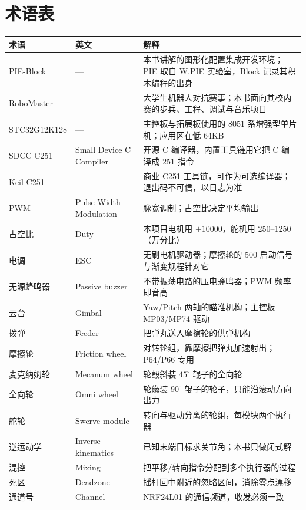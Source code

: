 \chapter{术语表}
\label{app:glossary}

\begin{center}
\begin{tabularx}{\linewidth}{@{}l l >{\raggedright\arraybackslash}X@{}}
\toprule
术语 & 英文 & 解释 \\
\midrule
PIE-Block & --- & 本书讲解的图形化配置集成开发环境；PIE 取自 W.PIE 实验室，Block 记录其积木编程的出身 \\
RoboMaster & --- & 大学生机器人对抗赛事；本书面向其校内赛的步兵、工程、调试与音乐项目 \\
STC32G12K128 & --- & 主控板与拓展板使用的 8051 系增强型单片机；应用区在低 64KB \\
SDCC C251 & Small Device C Compiler & 开源 C 编译器，内置工具链用它把 C 编译成 251 指令 \\
Keil C251 & --- & 商业 C251 工具链，可作为可选编译器；退出码不可信，以日志为准 \\
PWM & Pulse Width Modulation & 脉宽调制；占空比决定平均输出 \\
占空比 & Duty & 本项目电机用 $\pm10000$，舵机用 250--1250（万分比） \\
电调 & ESC & 无刷电机驱动器；摩擦轮的 500 启动信号与渐变规程针对它 \\
无源蜂鸣器 & Passive buzzer & 不带振荡电路的压电蜂鸣器；PWM 频率即音高 \\
云台 & Gimbal & Yaw/Pitch 两轴的瞄准机构；主控板 MP03/MP74 驱动 \\
拨弹 & Feeder & 把弹丸送入摩擦轮的供弹机构 \\
摩擦轮 & Friction wheel & 对转轮组，靠摩擦把弹丸加速射出；P64/P66 专用 \\
麦克纳姆轮 & Mecanum wheel & 轮毂斜装 $45^\circ$ 辊子的全向轮 \\
全向轮 & Omni wheel & 轮缘装 $90^\circ$ 辊子的轮子，只能沿滚动方向出力 \\
舵轮 & Swerve module & 转向与驱动分离的轮组，每模块两个执行器 \\
逆运动学 & Inverse kinematics & 已知末端目标求关节角；本书只做闭式解 \\
混控 & Mixing & 把平移/转向指令分配到多个执行器的过程 \\
死区 & Deadzone & 摇杆回中附近的忽略区间，消除零点漂移 \\
通道号 & Channel & NRF24L01 的通信频道，收发必须一致 \\

\end{tabularx}
\end{center}
